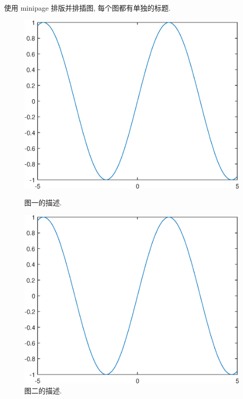 \documentclass[UTF8,openany,twoside,12pt]{book}
\theoremstyle{plain}
\begin{document}
使用 minipage 排版并排插图, 每个图都有单独的标题.
\begin{figure}[htp!]
\begin{minipage}[t]{0.48\linewidth}
\centering
  \includegraphics[width=0.9\linewidth]{image1.eps}
    \caption{图一的描述.}
    \label{fig:image1}
\end{minipage}
  \hfill
\begin{minipage}[t]{0.48\linewidth}
\centering
   \includegraphics[width=0.9\linewidth]{image1.eps}
   \caption{图二的描述.}
   \label{fig:image2}
\end{minipage}
\end{figure}



\end{document}
